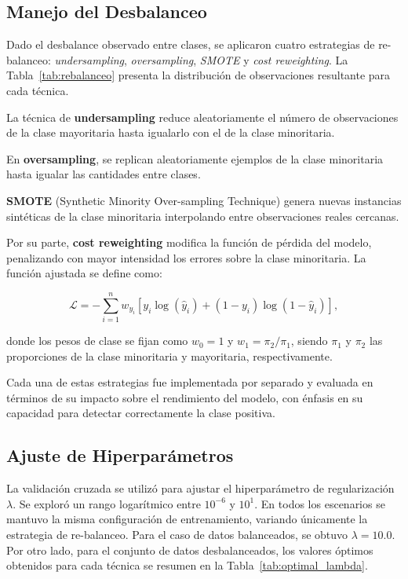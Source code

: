 \subsection{Manejo del Desbalanceo}\label{subsec:desbalanceo}

Dado el desbalance observado entre clases, se aplicaron cuatro estrategias de re-balanceo: \textit{undersampling}, \textit{oversampling}, \textit{SMOTE} y \textit{cost reweighting}. La Tabla~\ref{tab:rebalanceo} presenta la distribución de observaciones resultante para cada técnica.

La técnica de \textbf{undersampling} reduce aleatoriamente el número de observaciones de la clase mayoritaria hasta igualarlo con el de la clase minoritaria.

En \textbf{oversampling}, se replican aleatoriamente ejemplos de la clase minoritaria hasta igualar las cantidades entre clases.

\textbf{SMOTE} (Synthetic Minority Over-sampling Technique) genera nuevas instancias sintéticas de la clase minoritaria interpolando entre observaciones reales cercanas.

Por su parte, \textbf{cost reweighting} modifica la función de pérdida del modelo, penalizando con mayor intensidad los errores sobre la clase minoritaria. La función ajustada se define como:

\begin{equation}
\mathcal{L} = -\sum_{i=1}^{n} w_{y_i} \left[ y_i \log(\hat{y}_i) + (1 - y_i) \log(1 - \hat{y}_i) \right],
\end{equation}

donde los pesos de clase se fijan como \( w_0 = 1 \) y \( w_1 = \pi_2 / \pi_1 \), siendo \( \pi_1 \) y \( \pi_2 \) las proporciones de la clase minoritaria y mayoritaria, respectivamente.

Cada una de estas estrategias fue implementada por separado y evaluada en términos de su impacto sobre el rendimiento del modelo, con énfasis en su capacidad para detectar correctamente la clase positiva.




\subsection{Ajuste de Hiperparámetros}\label{subsec:hiperparams-cancer}

La validación cruzada se utilizó para ajustar el hiperparámetro de regularización \(\lambda\). Se exploró un rango logarítmico entre \(10^{-6}\) y \(10^1\). En todos los escenarios se mantuvo la misma configuración de entrenamiento, variando únicamente la estrategia de re-balanceo. Para el caso de datos balanceados, se obtuvo $\lambda= 10.0 $. Por otro lado, para el conjunto de datos desbalanceados, los valores óptimos obtenidos para cada técnica se resumen en la Tabla~\ref{tab:optimal_lambda}.




